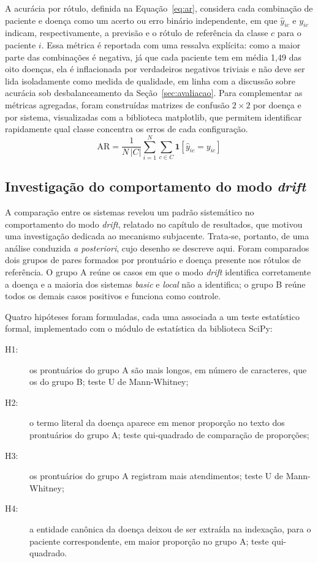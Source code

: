 A acurácia por rótulo, definida na Equação~\eqref{eq:ar}, considera cada combinação de paciente e doença como um acerto ou erro binário independente, em que $\hat{y}_{ic}$ e $y_{ic}$ indicam, respectivamente, a previsão e o rótulo de referência da classe $c$ para o paciente $i$. Essa métrica é reportada com uma ressalva explícita: como a maior parte das combinações é negativa, já que cada paciente tem em média 1,49 das oito doenças, ela é inflacionada por verdadeiros negativos triviais e não deve ser lida isoladamente como medida de qualidade, em linha com a discussão sobre acurácia sob desbalanceamento da Seção~\ref{sec:avaliacao}. Para complementar as métricas agregadas, foram construídas matrizes de confusão $2 \times 2$ por doença e por sistema, visualizadas com a biblioteca matplotlib, que permitem identificar rapidamente qual classe concentra os erros de cada configuração.
\begin{equation}
\mathrm{AR} = \frac{1}{N\,|C|}\sum_{i=1}^{N}\sum_{c \in C} \mathbf{1}\left[\hat{y}_{ic} = y_{ic}\right]
\label{eq:ar}
\end{equation}

\subsection{Investigação do comportamento do modo \texorpdfstring{\textit{drift}}{drift}}\label{sec:met-hipoteses}

A comparação entre os sistemas revelou um padrão sistemático no comportamento do modo \textit{drift}, relatado no capítulo de resultados, que motivou uma investigação dedicada ao mecanismo subjacente. Trata-se, portanto, de uma análise conduzida \textit{a posteriori}, cujo desenho se descreve aqui. Foram comparados dois grupos de pares formados por prontuário e doença presente nos rótulos de referência. O grupo A reúne os casos em que o modo \textit{drift} identifica corretamente a doença e a maioria dos sistemas \textit{basic} e \textit{local} não a identifica; o grupo B reúne todos os demais casos positivos e funciona como controle.

Quatro hipóteses foram formuladas, cada uma associada a um teste estatístico formal, implementado com o módulo de estatística da biblioteca SciPy:
\begin{description}
    \item[H1:] os prontuários do grupo A são mais longos, em número de caracteres, que os do grupo B; teste U de Mann-Whitney;
    \item[H2:] o termo literal da doença aparece em menor proporção no texto dos prontuários do grupo A; teste qui-quadrado de comparação de proporções;
    \item[H3:] os prontuários do grupo A registram mais atendimentos; teste U de Mann-Whitney;
    \item[H4:] a entidade canônica da doença deixou de ser extraída na indexação, para o paciente correspondente, em maior proporção no grupo A; teste qui-quadrado.
\end{description}

